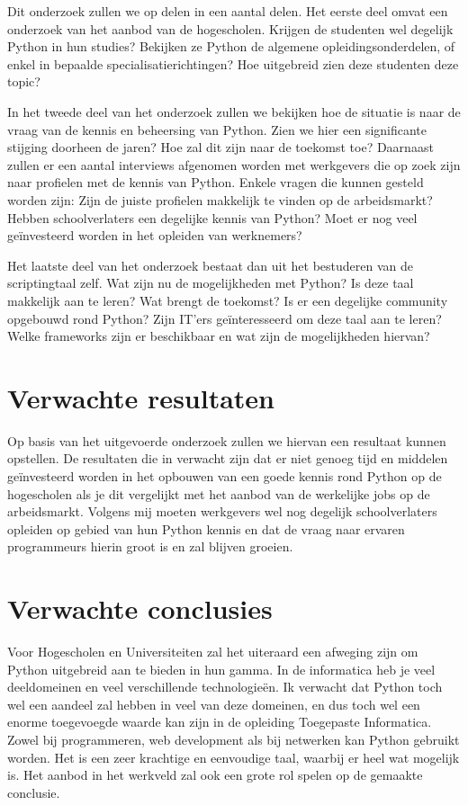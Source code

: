 Dit onderzoek zullen we op delen in een aantal delen. Het eerste deel omvat een onderzoek van het aanbod van de hogescholen. Krijgen de studenten wel degelijk Python in hun studies? Bekijken ze Python de algemene opleidingsonderdelen, of enkel in bepaalde specialisatierichtingen? Hoe uitgebreid zien deze studenten deze topic?

In het tweede deel van het onderzoek zullen we bekijken hoe de situatie is naar de vraag van de kennis en beheersing van Python. Zien we hier een significante stijging doorheen de jaren? Hoe zal dit zijn naar de toekomst toe? Daarnaast zullen er een aantal interviews afgenomen worden met werkgevers die op zoek zijn naar profielen met de kennis van Python. Enkele vragen die kunnen gesteld worden zijn: Zijn de juiste profielen makkelijk te vinden op de arbeidsmarkt? Hebben schoolverlaters een degelijke kennis van Python? Moet er nog veel geïnvesteerd worden in het opleiden van werknemers?

Het laatste deel van het onderzoek bestaat dan uit het bestuderen van de scriptingtaal zelf. Wat zijn nu de mogelijkheden met Python? Is deze taal makkelijk aan te leren? Wat brengt de toekomst? Is er een degelijke community opgebouwd rond Python?  Zijn IT’ers geïnteresseerd om deze taal aan te leren? Welke frameworks zijn er beschikbaar en wat zijn de mogelijkheden hiervan?


\section{Verwachte resultaten}
\label{sec:verwachte_resultaten}

Op basis van het uitgevoerde onderzoek zullen we hiervan een resultaat kunnen opstellen. De resultaten die in verwacht zijn dat er niet genoeg tijd en middelen geïnvesteerd worden in het opbouwen van een goede kennis rond Python op de hogescholen als je dit vergelijkt met het aanbod van de werkelijke jobs op de arbeidsmarkt. Volgens mij moeten werkgevers wel nog degelijk schoolverlaters opleiden op gebied van hun Python kennis en dat de vraag naar ervaren programmeurs hierin groot is en zal blijven groeien.

\section{Verwachte conclusies}
\label{sec:verwachte_conclusies}

Voor Hogescholen en Universiteiten zal het uiteraard een afweging zijn om Python uitgebreid aan te bieden in hun gamma. In de informatica heb je veel deeldomeinen en veel verschillende technologieën. Ik verwacht dat Python toch wel een aandeel zal hebben in veel van deze domeinen, en dus toch wel een enorme toegevoegde waarde kan zijn in de opleiding Toegepaste Informatica. Zowel bij programmeren, web development als bij netwerken kan Python gebruikt worden. Het is een zeer krachtige en eenvoudige taal, waarbij er heel wat mogelijk is. Het aanbod in het werkveld zal ook een grote rol spelen op de gemaakte conclusie.

